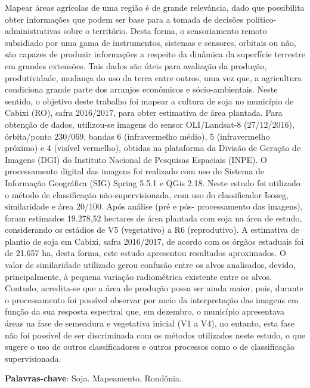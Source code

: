 \documentclass[article,12pt,onesidea,4paper,english,brazil]{abntex2}
\begin{document}
	\noindent Mapear áreas agrícolas de uma região é de grande relevância, dado que possibilita
	obter informações que podem ser base para a tomada de decisões político-
	administrativas sobre o território. Desta forma, o sensoriamento remoto subsidiado
	por uma gama de instrumentos, sistemas e sensores, orbitais ou não, são capazes
	de produzir informações a respeito da dinâmica da superfície terrestre em grandes
	extensões. Tais dados são úteis para avaliação da produção, produtividade,
	mudança do uso da terra entre outros, uma vez que, a agricultura condiciona grande
	parte dos arranjos econômicos e sócio-ambientais. Neste sentido, o objetivo deste
	trabalho foi mapear a cultura de soja no município de Cabixi (RO), safra 2016/2017,
	para obter estimativa de área plantada. Para obtenção de dados, utilizou-se imagens
	do sensor OLI/Landsat-8 (27/12/2016), órbita/ponto 230/069, bandas 6
	(infravermelho médio), 5 (infravermelho próximo) e 4 (visível vermelho), obtidas na
	plataforma da Divisão de Geração de Imagens (DGI) do Instituto Nacional de
	Pesquisas Espaciais (INPE). O processamento digital das imagens foi realizado com
	uso do Sistema de Informação Geográfica (SIG) Spring 5.5.1 e QGis 2.18. Neste
	estudo foi utilizado o método de classificação não-supervisionada, com uso do
	classificador Isoseg, similaridade e área 20/100. Após análise (pré e pós-
	processamento das imagens), foram estimados 19.278,52 hectares de área plantada
	com soja na área de estudo, considerando os estádios de V5 (vegetativo) a R6
	(reprodutivo). A estimativa de plantio de soja em Cabixi, safra 2016/2017, de acordo
	com os órgãos estaduais foi de 21.657 ha, desta forma, este estudo apresentou
	resultados aproximados. O valor de similaridade utilizado gerou confusão entre os
	alvos analisados, devido, principalmente, à pequena variação radiométrica existente
	entre os alvos. Contudo, acredita-se que a área de produção possa ser ainda maior,
	pois, durante o processamento foi possível observar por meio da interpretação das
	imagens em função da sua resposta espectral que, em dezembro, o município
	apresentava áreas na fase de semeadura e vegetativa inicial (V1 a V4), no entanto,
	esta fase não foi possível de ser discriminada com os métodos utilizados neste
	estudo, o que sugere o uso de outros classificadores e outros processos como o de
	classificação supervisionada.
	
	\vspace{\onelineskip}
	
	\noindent
	\textbf{Palavras-chave}: Soja. Mapeamento. Rondônia.
	
\end{document}
